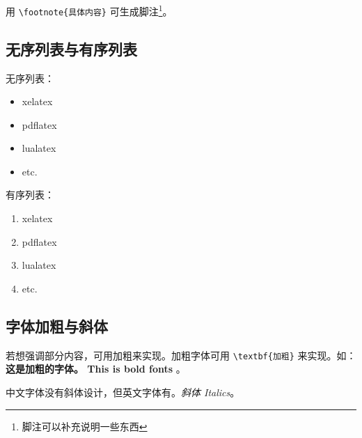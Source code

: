 用 \verb|\footnote{具体内容}| 可生成脚注\footnote{脚注可以补充说明一些东西}。

\subsection{无序列表与有序列表}

无序列表：
\begin{itemize}
  \item xelatex
  \item pdflatex
  \item lualatex
  \item etc.
\end{itemize}

有序列表：
\begin{enumerate}
  \item xelatex
  \item pdflatex
  \item lualatex
  \item etc.
\end{enumerate}

\subsection{字体加粗与斜体}

若想强调部分内容，可用加粗来实现。加粗字体可用 \verb|\textbf{加粗}| 来实现。如： \textbf{这是加粗的字体。 This is bold fonts} 。

中文字体没有斜体设计，但英文字体有。\textit{斜体 Italics}。

